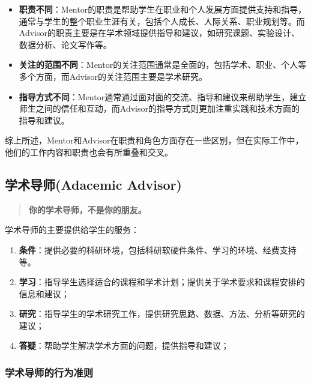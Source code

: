 \documentclass[
]{ctexbook}
\providecommand{\tightlist}{%
  \setlength{\itemsep}{0pt}\setlength{\parskip}{0pt}}
\begin{document}
\begin{itemize}
\item
  \textbf{职责不同}：Mentor的职责是帮助学生在职业和个人发展方面提供支持和指导，通常与学生的整个职业生涯有关，包括个人成长、人际关系、职业规划等。而Advisor的职责主要是在学术领域提供指导和建议，如研究课题、实验设计、数据分析、论文写作等。
\item
  \textbf{关注的范围不同}：Mentor的关注范围通常是全面的，包括学术、职业、个人等多个方面，而Advisor的关注范围主要是学术研究。
\item
  \textbf{指导方式不同}：Mentor通常通过面对面的交流、指导和建议来帮助学生，建立师生之间的信任和互动，而Advisor的指导方式则更加注重实践和技术方面的指导和建议。
\end{itemize}

综上所述，Mentor和Advisor在职责和角色方面存在一些区别，但在实际工作中，他们的工作内容和职责也会有所重叠和交叉。

\hypertarget{ux5b66ux672fux5bfcux5e08adacemic-advisor}{%
\subsection{学术导师(Adacemic Advisor)}\label{ux5b66ux672fux5bfcux5e08adacemic-advisor}}

\begin{quote}
\textbf{你的学术导师，不是你的朋友。}
\end{quote}

学术导师的主要提供给学生的服务：

\begin{enumerate}
\def\labelenumi{\arabic{enumi}.}
\tightlist
\item
  \textbf{条件}：提供必要的科研环境，包括科研软硬件条件、学习的环境、经费支持等。
\item
  \textbf{学习}：指导学生选择适合的课程和学术计划；提供关于学术要求和课程安排的信息和建议；
\item
  \textbf{研究}：指导学生的学术研究工作，提供研究思路、数据、方法、分析等研究的建议；
\item
  \textbf{答疑}：帮助学生解决学术方面的问题，提供指导和建议；
\end{enumerate}

\hypertarget{ux5b66ux672fux5bfcux5e08ux7684ux884cux4e3aux51c6ux5219}{%
\subsubsection{学术导师的行为准则}\label{ux5b66ux672fux5bfcux5e08ux7684ux884cux4e3aux51c6ux5219}}
\end{document}
